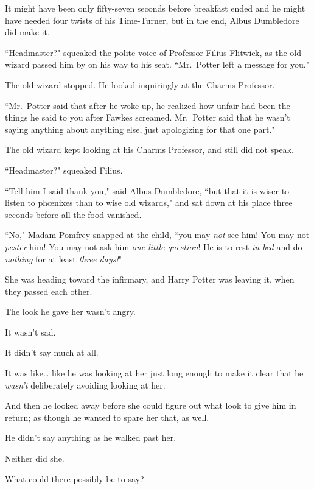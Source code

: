 
It might have been only fifty-seven seconds before breakfast ended and he might have needed four twists of his Time-Turner, but in the end, Albus Dumbledore did make it.

``Headmaster?" squeaked the polite voice of Professor Filius Flitwick, as the old wizard passed him by on his way to his seat. ``Mr.~Potter left a message for you."

The old wizard stopped. He looked inquiringly at the Charms Professor.

``Mr.~Potter said that after he woke up, he realized how unfair had been the things he said to you after Fawkes screamed. Mr.~Potter said that he wasn't saying anything about anything else, just apologizing for that one part."

The old wizard kept looking at his Charms Professor, and still did not speak.

``Headmaster?" squeaked Filius.

``Tell him I said thank you," said Albus Dumbledore, ``but that it is wiser to listen to phœnixes than to wise old wizards," and sat down at his place three seconds before all the food vanished.


``No," Madam Pomfrey snapped at the child, ``you may \emph{not} see him! You may not \emph{pester} him! You may not ask him \emph{one little question}! He is to rest \emph{in bed} and do \emph{nothing} for at least \emph{three days!}"


She was heading toward the infirmary, and Harry Potter was leaving it, when they passed each other.

The look he gave her wasn't angry.

It wasn't sad.

It didn't say much at all.

It was like{\ldots} like he was looking at her just long enough to make it clear that he \emph{wasn't} deliberately avoiding looking at her.

And then he looked away before she could figure out what look to give him in return; as though he wanted to spare her that, as well.

He didn't say anything as he walked past her.

Neither did she.

What could there possibly be to say?

